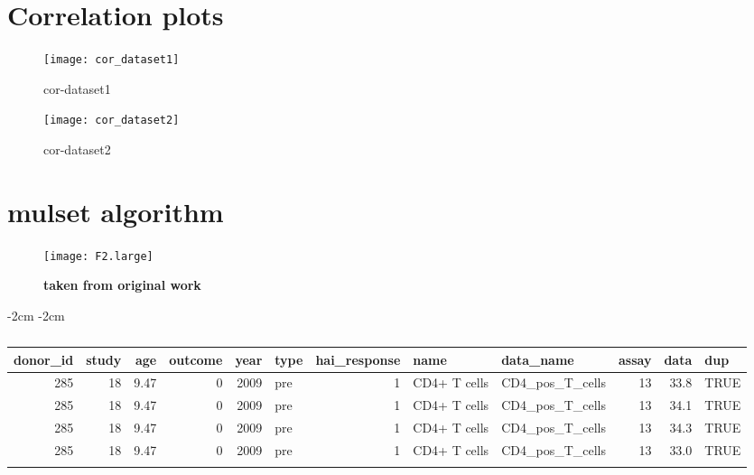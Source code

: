 \printbibliography

\begin{appendices}

    \section{Correlation plots}

\begin{figure}[htpb]
    \centering
    \texttt{[image: cor\_dataset1]}
    \caption{cor-dataset1}
    \label{fig:cor-dataset1}
\end{figure}

\begin{figure}[htpb]
    \centering
    \texttt{[image: cor\_dataset2]}
    \caption{cor-dataset2}
    \label{fig:cor-dataset2}
\end{figure}

    \section{mulset algorithm}

\begin{figure}[htpb]
    \texttt{[image: F2.large]}
    \caption{\textbf{taken from original work}}\label{fig:mulsetAlg}
\end{figure}

\begin{table}[htpb]
\addtolength{\leftskip} {-2cm} %
\addtolength{\rightskip} {-2cm} %
\begin{tabular}{rrrrrlrllrrl}
\toprule{}
donor\_id & study & age & outcome & year & type & hai\_response & name & data\_name & assay & data & dup\\
\midrule{}
285 & 18 & 9.47 & 0 & 2009 & pre & 1 & CD4+ T cells & CD4\_pos\_T\_cells & 13 & 33.8 & TRUE\\
285 & 18 & 9.47 & 0 & 2009 & pre & 1 & CD4+ T cells & CD4\_pos\_T\_cells & 13 & 34.1 & TRUE\\
285 & 18 & 9.47 & 0 & 2009 & pre & 1 & CD4+ T cells & CD4\_pos\_T\_cells & 13 & 34.3 & TRUE\\
285 & 18 & 9.47 & 0 & 2009 & pre & 1 & CD4+ T cells & CD4\_pos\_T\_cells & 13 & 33.0 & TRUE\\
\bottomrule{}
\end{tabular}
    \caption{}\label{tbl:exampleDuplicate}
\end{table}




\end{appendices}
